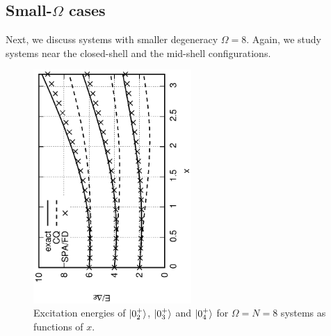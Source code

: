 \documentclass[%
superscriptaddress,
preprint,
showpacs,
nofootinbib,
amsmath,amssymb,
aps,
prc,
floatfix ]%
{revtex4-1}
\begin{document}
\subsection{Small-$\Omega$ cases}

Next, we discuss systems with smaller degeneracy $\Omega=8$.
Again, we study systems near the closed-shell and the mid-shell configurations.

\begin{figure}[t]
 \begin{center}
  \includegraphics[width=60mm,angle=-90]{images/N8ex_energy_wo_adiabatic.eps}
 \end{center}
 \caption{Excitation energies of $\ket{0_2^+}$, $\ket{0_3^+}$ and
$\ket{0_4^+}$ for $\Omega=N=8$ systems as functions of $x$.
}
 \label{fig:N8energy}
\end{figure}
\end{document}
